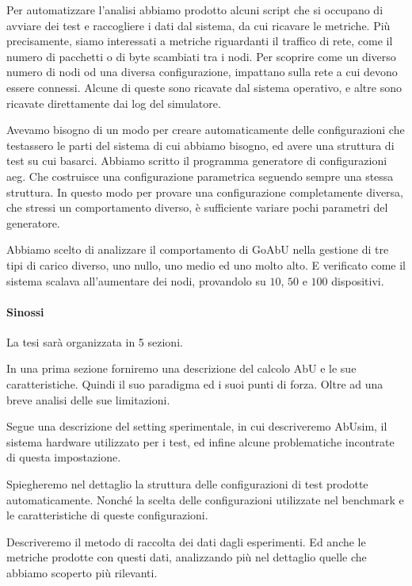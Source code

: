\documentclass[12pt, a4paper]{article}
\begin{document}
Per automatizzare l'analisi abbiamo prodotto alcuni script che si occupano di avviare dei test e raccogliere i dati dal sistema, da cui ricavare le metriche.
Più precisamente, siamo interessati a metriche riguardanti il traffico di rete, come il numero di pacchetti o di byte scambiati tra i nodi.
Per scoprire come un diverso numero di nodi od una diversa configurazione, impattano sulla rete a cui devono essere connessi. Alcune di queste sono ricavate dal sistema operativo, e altre sono ricavate direttamente dai log del simulatore.

Avevamo bisogno di un modo per creare automaticamente delle configurazioni che testassero le parti del sistema di cui abbiamo bisogno, ed avere una struttura di test su cui basarci. Abbiamo scritto il programma generatore di configurazioni aeg. Che costruisce una configurazione parametrica seguendo sempre una stessa struttura.
In questo modo per provare una configurazione completamente diversa, che stressi un comportamento diverso, è sufficiente variare pochi parametri del generatore.

Abbiamo scelto di analizzare il comportamento di GoAbU nella gestione di tre tipi di carico diverso, uno nullo, uno medio ed uno molto alto. E verificato come il sistema scalava all'aumentare dei nodi, provandolo su $10$, $50$ e $100$ dispositivi.

\paragraph{Sinossi}

La tesi sarà organizzata in 5 sezioni.

In una prima sezione forniremo una descrizione del calcolo AbU e le sue caratteristiche. Quindi il suo paradigma ed i suoi punti di forza. Oltre ad una breve analisi delle sue limitazioni.

Segue una descrizione del setting sperimentale, in cui descriveremo AbUsim, il sistema hardware utilizzato per i test, ed infine alcune problematiche incontrate di questa impostazione.

Spiegheremo nel dettaglio la struttura delle configurazioni di test prodotte automaticamente. Nonché la scelta delle configurazioni utilizzate nel benchmark e le caratteristiche di queste configurazioni.

Descriveremo il metodo di raccolta dei dati dagli esperimenti. Ed anche le metriche prodotte con questi dati, analizzando più nel dettaglio quelle che abbiamo scoperto più rilevanti.
\end{document}
